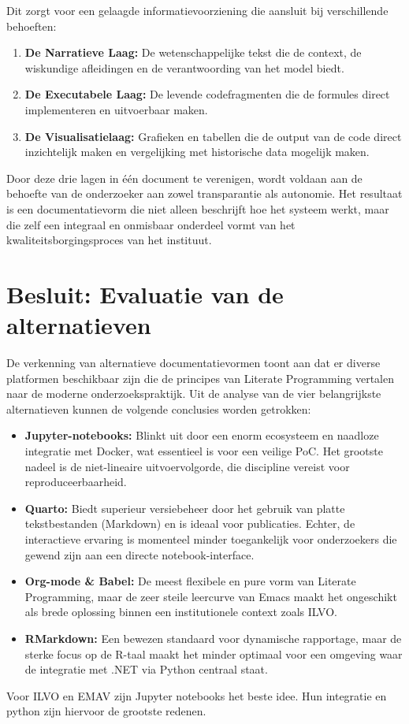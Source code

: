 Dit zorgt voor een gelaagde informatievoorziening die aansluit bij verschillende behoeften:
\begin{enumerate}
    \item \textbf{De Narratieve Laag:} De wetenschappelijke tekst die de context, de wiskundige afleidingen en de verantwoording van het model biedt.
    \item \textbf{De Executabele Laag:} De levende codefragmenten die de formules direct implementeren en uitvoerbaar maken.
    \item \textbf{De Visualisatielaag:} Grafieken en tabellen die de output van de code direct inzichtelijk maken en vergelijking met historische data mogelijk maken.
\end{enumerate}
Door deze drie lagen in \'e\'en document te verenigen, wordt voldaan aan de behoefte van de onderzoeker aan zowel transparantie als autonomie. Het resultaat is een documentatievorm die niet alleen beschrijft hoe het systeem werkt, maar die zelf een integraal en onmisbaar onderdeel vormt van het kwaliteitsborgingsproces van het instituut.

\section{Besluit: Evaluatie van de alternatieven}
De verkenning van alternatieve documentatievormen toont aan dat er diverse platformen beschikbaar zijn die de principes van Literate Programming vertalen naar de moderne onderzoekspraktijk. Uit de analyse van de vier belangrijkste alternatieven kunnen de volgende conclusies worden getrokken:

\begin{itemize}
    \item \textbf{Jupyter-notebooks:} Blinkt uit door een enorm ecosysteem en naadloze integratie met Docker, wat essentieel is voor een veilige PoC. Het grootste nadeel is de niet-lineaire uitvoervolgorde, die discipline vereist voor reproduceerbaarheid.
    \item \textbf{Quarto:} Biedt superieur versiebeheer door het gebruik van platte tekstbestanden (Markdown) en is ideaal voor publicaties. Echter, de interactieve ervaring is momenteel minder toegankelijk voor onderzoekers die gewend zijn aan een directe notebook-interface.
    \item \textbf{Org-mode \& Babel:} De meest flexibele en pure vorm van Literate Programming, maar de zeer steile leercurve van Emacs maakt het ongeschikt als brede oplossing binnen een institutionele context zoals ILVO.
    \item \textbf{RMarkdown:} Een bewezen standaard voor dynamische rapportage, maar de sterke focus op de R-taal maakt het minder optimaal voor een omgeving waar de integratie met .NET via Python centraal staat.
\end{itemize}

Voor ILVO en EMAV zijn Jupyter notebooks het beste idee. Hun integratie en python zijn hiervoor de grootste redenen.
